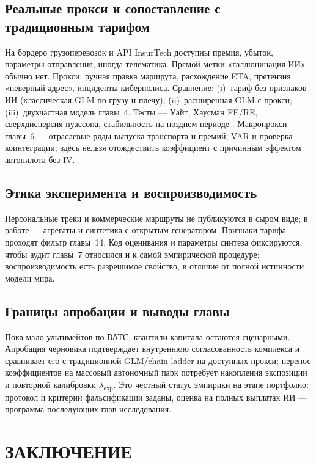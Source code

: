 \documentclass[a4paper,14pt]{extarticle}
\begin{document}
\subsection{Реальные прокси и сопоставление с традиционным тарифом}

На бордеро грузоперевозок и API InsurTech \cite{insurtech} доступны премия, убыток, параметры отправления, иногда телематика. Прямой метки «галлюцинация ИИ» обычно нет. Прокси: ручная правка маршрута, расхождение ETA, претензия «неверный адрес», инциденты киберполиса. Сравнение: (i)~тариф без признаков ИИ (классическая GLM по грузу и плечу); (ii)~расширенная GLM с прокси; (iii)~двухчастная модель главы~4. Тесты --- Уайт, Хаусман FE/RE, сверхдисперсия пуассона, стабильность на позднем периоде \cite{verbeek}. Макропрокси главы~6 --- отраслевые ряды выпуска транспорта и премий, VAR и проверка коинтеграции; здесь нельзя отождествить коэффициент с причинным эффектом автопилота без IV.

\subsection{Этика эксперимента и воспроизводимость}

Персональные треки и коммерческие маршруты не публикуются в сыром виде; в работе --- агрегаты и синтетика с открытым генератором. Признаки тарифа проходят фильтр главы~14. Код оценивания и параметры синтеза фиксируются, чтобы аудит главы~7 относился и к самой эмпирической процедуре: воспроизводимость есть разрешимое свойство, в отличие от полной истинности модели мира.

\subsection{Границы апробации и выводы главы}

Пока мало ультимейтов по ВАТС, квантили капитала остаются сценарными. Апробация черновика подтверждает внутреннюю согласованность комплекса и сравнивает его с традиционной GLM/chain-ladder на доступных прокси; перенос коэффициентов на массовый автономный парк потребует накопления экспозиции и повторной калибровки $\lambda_{\mathrm{exp}}$. Это честный статус эмпирики на этапе портфолио: протокол и критерии фальсификации заданы, оценка на полных выплатах ИИ --- программа последующих глав исследования.


\section*{ЗАКЛЮЧЕНИЕ}
\end{document}
